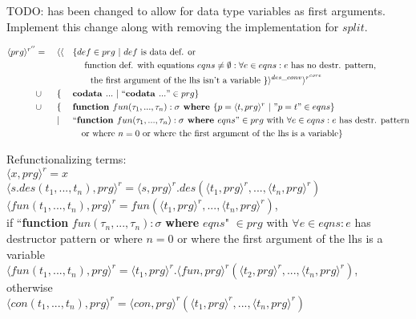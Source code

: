 \documentclass[11pt]{article} %
\begin{document}
TODO: has been changed to allow for data type variables as first arguments. Implement this change along with removing the implementation for $split$.

\begin{alignat*}{3}
\langle prg \rangle^{r''} & = ~&& \langle \langle && \{ def \in prg ~ | ~ def \textrm{ is data def. or} \\ & && &&\quad \textrm{ function def. with equations } eqns \neq \emptyset: \forall e \in eqns: e \textrm{ has no destr. pattern}, \\
& && &&\qquad \textrm{the first argument of the lhs isn't a variable } \} \rangle^{des\_conv} \rangle^{r^{core}} \\
& \cup && \{ && \textrm{\textbf{codata }} ... ~ | ~ `` \textrm{\textbf{codata }} ... " \in prg \} \\
& \cup && \{ && \textrm{\textbf{function }} fun(\tau_1, ..., \tau_n): \sigma \textrm{\textbf{ where }} \{ p = \langle t, prg \rangle^r ~ | ~ "p = t" \in eqns \} \\
& && | && `` \textrm{\textbf{function }} fun(\tau_1, ..., \tau_n): \sigma \textrm{\textbf{ where }} eqns " \in prg \textrm{ with } \forall e \in eqns: e \textrm{ has destr. pattern} \\
& && &&\quad \textrm{or where } n = 0 \textrm{ or where the first argument of the lhs is a variable} \} 
\end{alignat*}

Refunctionalizing terms: \\
$\langle x, prg \rangle^r = x$ \\
$\langle s.des(t_1, ..., t_n), prg \rangle^r = \langle s, prg \rangle^r .des(\langle t_1, prg \rangle^r, ..., \langle t_n, prg \rangle^r)$ \\
$\langle fun(t_1, ..., t_n), prg \rangle^r = fun(\langle t_1, prg \rangle^r, ..., \langle t_n, prg \rangle^r)$, \\
if ``\textbf{function} $fun(\tau_n, ..., \tau_n): \sigma$ \textbf{where} $eqns$" $\in prg$  with $\forall e \in eqns: e$ has destructor pattern or where $n = 0$ or where the first argument of the lhs is a variable \\
$\langle fun(t_1, ..., t_n), prg \rangle^r = \langle t_1, prg \rangle^r .\langle fun, prg \rangle^r (\langle t_2, prg \rangle^r, ..., \langle t_n, prg \rangle^r)$, \\
otherwise \\
$\langle con(t_1, ..., t_n), prg \rangle^r = \langle con, prg \rangle^r (\langle t_1, prg \rangle^r, ..., \langle t_n, prg \rangle^r)$ \\
\end{document}
